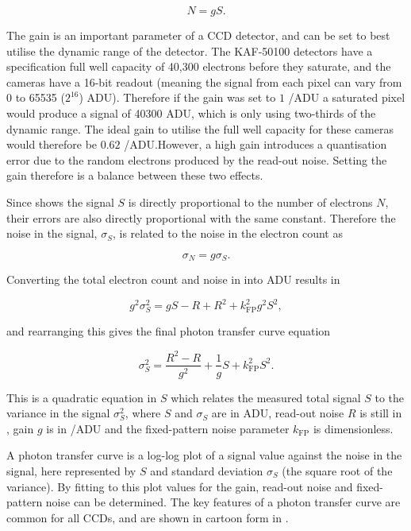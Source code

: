 \begin{colsection}
\begin{colsection}
\begin{equation}
    N = g S.
    \label{eq:gain}
\end{equation}

The gain is an important parameter of a CCD detector, and can be set to best utilise the dynamic range of the detector. The KAF-50100 detectors have a specification full well capacity of 40,300 electrons before they saturate, and the cameras have a 16-bit readout (meaning the signal from each pixel can vary from 0 to 65535 ($2^{16}$) ADU). Therefore if the gain was set to $1$ \elec/ADU a saturated pixel would produce a signal of 40300 ADU, which is only using two-thirds of the dynamic range. The ideal gain to utilise the full well capacity for these cameras would therefore be $0.62$ \elec/ADU.\@ However, a high gain introduces a quantisation error due to the random electrons produced by the read-out noise. Setting the gain therefore is a balance between these two effects.

Since  shows the signal $S$ is directly proportional to the number of electrons $N$, their errors are also directly proportional with the same constant. Therefore the noise in the signal, $\sigma_S$, is related to the noise in the electron count as

\begin{equation}
    \sigma_N = g \sigma_S.
    \label{eq:noise_gain}
\end{equation}

Converting the total electron count and noise in  into ADU results in

\begin{equation}
    g^2\sigma_S^2 = gS - R + R^2 + k_\text{FP}^2 g^2 S^2,
    \label{eq:ptc_noise2}
\end{equation}

and rearranging this gives the final photon transfer curve equation

\begin{equation}
    \sigma_S^2 = \frac{R^2 - R}{g^2} + \frac{1}{g}S + k_\text{FP}^2 S^2.
    \label{eq:ptc}
\end{equation}

This is a quadratic equation in $S$ which relates the measured total signal $S$ to the variance in the signal $\sigma_S^2$, where $S$ and $\sigma_S$ are in ADU, read-out noise $R$ is still in \elec, gain $g$ is in \elec/ADU and the fixed-pattern noise parameter $k_\text{FP}$ is dimensionless.

A photon transfer curve is a log-log plot of a signal value against the noise in the signal, here represented by $S$ and standard deviation $\sigma_S$ (the square root of the variance). By fitting  to this plot values for the gain, read-out noise and fixed-pattern noise can be determined. The key features of a photon transfer curve are common for all CCDs, and are shown in cartoon form in .


\end{colsection}
\end{colsection}
